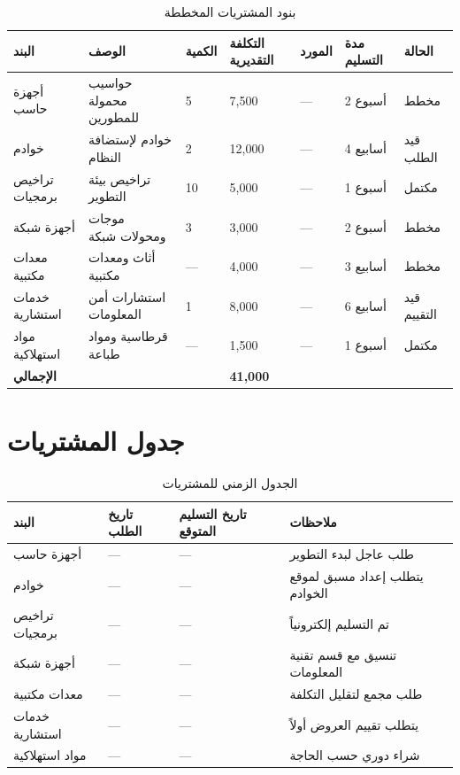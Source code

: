 \documentclass[11pt,a4paper]{article}
\begin{document}
\begin{table}[H]
\centering
\caption{بنود المشتريات المخططة}
\renewcommand{\arraystretch}{1.4}
\small
\begin{tabularx}{\textwidth}{L{2.8cm} L{3cm} C{1.5cm} R{2.2cm} L{2.5cm} C{1.8cm} L{1.8cm}}
\toprule
\textbf{البند} & \textbf{الوصف} & \textbf{الكمية} & \textbf{التكلفة التقديرية} & \textbf{المورد} & \textbf{مدة التسليم} & \textbf{الحالة} \\
\midrule
أجهزة حاسب & حواسيب محمولة للمطورين & 5 & 7{,}500 & --- & 2 أسبوع & مخطط \\
خوادم & خوادم لإستضافة النظام & 2 & 12{,}000 & --- & 4 أسابيع & قيد الطلب \\
تراخيص برمجيات & تراخيص بيئة التطوير & 10 & 5{,}000 & --- & 1 أسبوع & مكتمل \\
أجهزة شبكة & موجات ومحولات شبكة & 3 & 3{,}000 & --- & 2 أسبوع & مخطط \\
معدات مكتبية & أثاث ومعدات مكتبية & --- & 4{,}000 & --- & 3 أسابيع & مخطط \\
خدمات استشارية & استشارات أمن المعلومات & 1 & 8{,}000 & --- & 6 أسابيع & قيد التقييم \\
مواد استهلاكية & قرطاسية ومواد طباعة & --- & 1{,}500 & --- & 1 أسبوع & مكتمل \\
\midrule
\textbf{الإجمالي} &  & \textbf{41{,}000} &  \\
\bottomrule
\end{tabularx}
\end{table}

\section{جدول المشتريات}
\label{sec:schedule}

\begin{table}[H]
\centering
\caption{الجدول الزمني للمشتريات}
\renewcommand{\arraystretch}{1.4}
\begin{tabularx}{\textwidth}{L{3cm} L{3cm} L{3cm} X}
\toprule
\textbf{البند} & \textbf{تاريخ الطلب} & \textbf{تاريخ التسليم المتوقع} & \textbf{ملاحظات} \\
\midrule
أجهزة حاسب & --- & --- & طلب عاجل لبدء التطوير \\
خوادم & --- & --- & يتطلب إعداد مسبق لموقع الخوادم \\
تراخيص برمجيات & --- & --- & تم التسليم إلكترونياً \\
أجهزة شبكة & --- & --- & تنسيق مع قسم تقنية المعلومات \\
معدات مكتبية & --- & --- & طلب مجمع لتقليل التكلفة \\
خدمات استشارية & --- & --- & يتطلب تقييم العروض أولاً \\
مواد استهلاكية & --- & --- & شراء دوري حسب الحاجة \\
\bottomrule
\end{tabularx}
\end{table}
\end{document}

